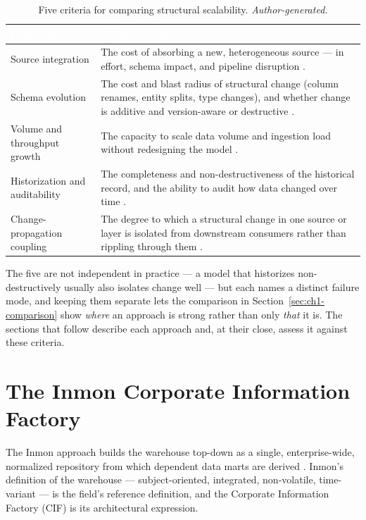 \begin{table}[H]
\centering
\renewcommand{\arraystretch}{1.35}
\caption{Five criteria for comparing structural scalability. \textit{Author-generated.}}
\label{tab:ch1-criteria}
\begin{tabularx}{\linewidth}{|>{\raggedright\arraybackslash}p{3.6cm}|>{\raggedright\arraybackslash}X|}
\hline
\rowcolor{tblheader}
\textcolor{white}{\textbf{Criterion}} &
\textcolor{white}{\textbf{What it measures}} \\
\hline
Source integration & The cost of absorbing a new, heterogeneous source --- in effort, schema impact, and pipeline disruption \parencite{vassiliadis2009}. \\
Schema evolution & The cost and blast radius of structural change (column renames, entity splits, type changes), and whether change is additive and version-aware or destructive \parencite{kleppmann2017}. \\
Volume and throughput growth & The capacity to scale data volume and ingestion load without redesigning the model \parencite{linstedt2015}. \\
Historization and auditability & The completeness and non-destructiveness of the historical record, and the ability to audit how data changed over time \parencite{golfarelli2009}. \\
Change-propagation coupling & The degree to which a structural change in one source or layer is isolated from downstream consumers rather than rippling through them \parencite{kleppmann2017}. \\
\hline
\end{tabularx}
\end{table}

The five are not independent in practice --- a model that historizes non-destructively usually also isolates change well --- but each names a distinct failure mode, and keeping them separate lets the comparison in Section~\ref{sec:ch1-comparison} show \textit{where} an approach is strong rather than only \textit{that} it is. The sections that follow describe each approach and, at their close, assess it against these criteria.

\section{The Inmon Corporate Information Factory}
\label{sec:ch1-inmon}

The Inmon approach builds the warehouse top-down as a single, enterprise-wide, normalized repository from which dependent data marts are derived \parencite{inmon2005}. Inmon's definition of the warehouse --- subject-oriented, integrated, non-volatile, time-variant --- is the field's reference definition, and the Corporate Information Factory (CIF) is its architectural expression.

